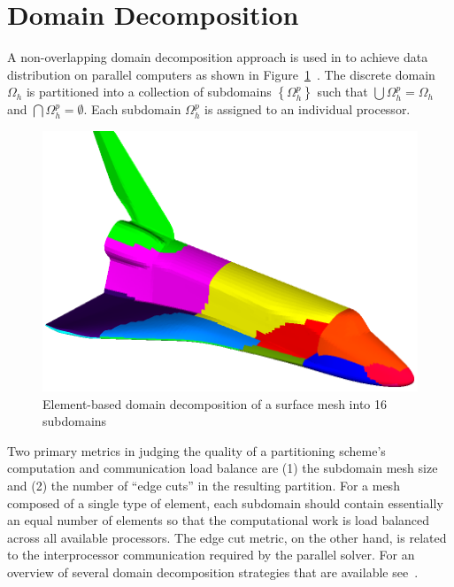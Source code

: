 \section{Domain Decomposition\label{sec:dd}}
A non-overlapping domain decomposition approach is used in
\libMesh{} to achieve data distribution on parallel computers as shown
in Figure~\ref{fig:orbiter_dd}~\cite{carey_gridbook}.  The discrete
domain $\Omega_h$ is partitioned into a collection of subdomains
$\left\{\Omega_h^p\right\}$ such that $\bigcup\Omega_h^p=\Omega_h$ and
$\bigcap\Omega_h^p=\emptyset$. Each subdomain $\Omega_h^p$ is
assigned to an individual processor.
\begin{figure}
  \begin{center}
    \includegraphics[width=.7\textwidth]{figures/domain_decomposition/orbiter_surface}
    \caption{Element-based domain decomposition of a surface mesh
      into 16 subdomains\label{fig:orbiter_dd}}
  \end{center}
\end{figure}
Two primary metrics in judging the quality of a partitioning scheme's computation and communication load balance are (1) the
subdomain mesh size and (2) the number of ``edge cuts'' in the resulting
partition.  For a mesh composed of a single type of element,
each subdomain should contain essentially an equal number of elements so that the
computational work is load balanced across all available processors.  The
edge cut metric, on the other hand, is related to the
interprocessor communication required by the parallel solver.
For an overview of several domain decomposition strategies
that are available see~\cite{iqbal_carey_2005,ZoltanOverviewArticle}.

